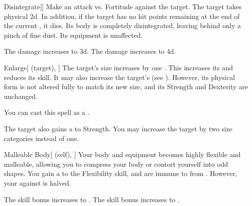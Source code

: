 \lowercase{\hypertarget{spell:Disintegrate}{}}\label{spell:Disintegrate}
\begin{freeability}[Rank 4]{\hypertarget{spell:Disintegrate}{Disintegrate}}[]
Make an attack vs. Fortitude against the target.
\hit The target takes physical  \plus2d.
In addition, if the target has no hit points remaining at the end of the current , it dies.
Its body is completely disintegrated, leaving behind only a pinch of fine dust.
Its equipment is unaffected.

\rankline
{} The damage increases to  \plus3d.
 The damage increases to  \plus4d.
\end{freeability}
\vspace{0.25em}



\lowercase{\hypertarget{spell:Enlarge}{}}\label{spell:Enlarge}
\begin{attuneability}[Rank 4]{\hypertarget{spell:Enlarge}{Enlarge}}[ (target), ]
The target's size increases by one .
This increases its  and reduces its  skill.
It may also increase the target's  (see ).
However, its physical form is not altered fully to match its new size, and its Strength and Dexterity are unchanged.

You can cast this spell as a .

\rankline
{} The target also gains a   to Strength.
 You may increase the target by two size categories instead of one.
\end{attuneability}
\vspace{0.25em}



\lowercase{\hypertarget{spell:Malleable Body}{}}\label{spell:Malleable Body}
\begin{attuneability}[Rank 4]{\hypertarget{spell:Malleable Body}{Malleable Body}}[ (self), ]
Your body and equipment becomes highly flexible and malleable, allowing you to compress your body or contort yourself into odd shapes.
You gain a   to the Flexibility skill, and are immune to  from .
However, your  against  is halved.

\rankline
{} The skill bonus increases to .
 The skill bonus increases to .
\end{attuneability}
\vspace{0.25em}



